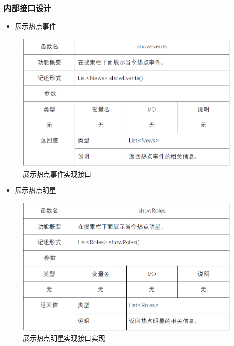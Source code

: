 \subsubsection{内部接口设计}
\begin{itemize}
	\item 展示热点事件
\end{itemize}
\begin{figure}[!htbp]
	\centering
	\includegraphics[scale=0.75]{image/b8.png} %
	\caption{展示热点事件实现接口} %
\end{figure}
\begin{itemize}
	\item 展示热点明星
\end{itemize}
\begin{figure}[!htbp]
	\centering
	\includegraphics[scale=0.75]{image/b9.png} %
	\caption{展示热点明星实现接口实现} %
\end{figure}
